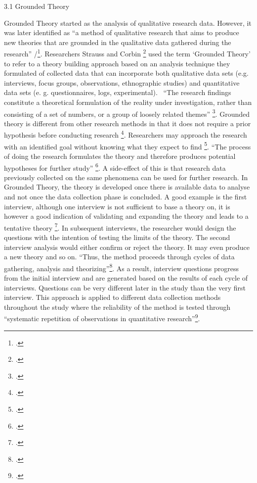3.1 Grounded Theory 

Grounded Theory started as the analysis of qualitative research data. However, it was later identified as “a method of qualitative research that aims to produce new theories that are grounded in the qualitative data gathered during the research” /\footcite{Glaser1967}.
Researchers Strauss and Corbin \footcite{Strauss1990} used the term ‘Grounded Theory’ to refer to a theory building approach based on an analysis technique they formulated of collected data that can incorporate both qualitative data sets (e.g. interviews, focus groups, observations, ethnographic studies) and quantitative data sets (e. g. questionnaires, logs, experimental).  “The research ﬁndings constitute a theoretical formulation of the reality under investigation, rather than consisting of a set of numbers, or a group of loosely related themes” \footcite {Strauss1990}.
Grounded theory is different from other research methods in that it does not require a prior hypothesis before conducting research \footcite{Glaser1967}.  Researchers may approach the research with an identified goal without knowing what they expect to find \footcite{Adams1997}. “The process of doing the research formulates the theory and therefore produces potential hypotheses for further study” \footcite{Adams1997}. A side-effect of this is that research data previously collected on the same phenomena can be used for further research.
In Grounded Theory, the theory is developed once there is available data to analyse and not once the data collection phase is concluded. A good example is the first interview, although one interview is not sufficient to base a theory on, it is however a good indication of validating and expanding the theory and leads to a tentative theory \footcite{Cox2008}.
In subsequent interviews, the researcher would design the questions with the intention of testing the limits of the theory.  The second interview analysis would either confirm or reject the theory.  It may even produce a new theory and so on. “Thus, the method proceeds through cycles of data gathering, analysis and theorizing”\footcite{Cox2008}.  As a result, interview questions progress from the initial interview and are generated based on the results of each cycle of interviews.  Questions can be very different later in the study than the very first interview.  This approach is applied to different data collection methods throughout the study where the reliability of the method is tested through “systematic repetition of observations in quantitative research”\footcite{Strauss1990}.
